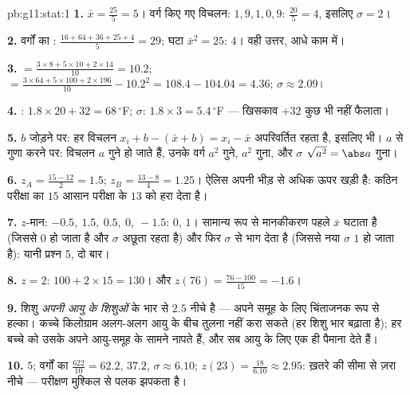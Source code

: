 \begin{solution}{pb:g11:stat:1}
\textbf{1.}  $\bar x = \frac{25}{5} = 5$। वर्ग किए गए विचलन: $1, 9, 1, 0, 9$:  $\frac{20}{5} = 4$, इसलिए $\sigma = 2$।

\textbf{2.} वर्गों का : $\frac{16 + 64 + 36 + 25 + 4}{5} = 29$; घटा $\bar x^2 = 25$:  $4$। वही उत्तर, आधे
काम में।

\textbf{3.}  $= \frac{3 \times 8 + 5 \times 10 + 2 \times
14}{10} = 10.2$;  $= \frac{3 \times 64 + 5 \times 100 +
2 \times 196}{10} - 10.2^2 = 108.4 - 104.04 = 4.36$; $\sigma \approx 2.09$।

\textbf{4.} : $1.8 \times 20 + 32 = 68\,^\circ$F; $\sigma$: $1.8 \times 3 = 5.4\,^\circ$F --- खिसकाव $+32$ कुछ भी नहीं
फैलाता।

\textbf{5.} $b$ जोड़ने पर: हर विचलन $x_i + b - (\bar x + b)
= x_i - \bar x$ अपरिवर्तित रहता है, इसलिए 
भी। $a$ से गुणा करने पर: विचलन $a$ गुने हो जाते हैं, उनके वर्ग $a^2$
गुने,  $a^2$ गुना, और $\sigma$ $\sqrt{a^2} = \abs a$ गुना।

\textbf{6.} $z_A = \frac{15 - 12}{2} = 1.5$; $z_B = \frac{13 - 8}{4} = 1.25$। ऐलिस अपनी भीड़ से अधिक ऊपर खड़ी है: कठिन परीक्षा
का $15$ आसान परीक्षा के $13$ को हरा देता है।

\textbf{7.} $z$-मान: $-0.5,\ 1.5,\ 0.5,\ 0,\ -1.5$:  $0$,  $1$। सामान्य रूप से
मानकीकरण पहले $\bar x$ घटाता है (जिससे  $0$ हो जाता है और $\sigma$ अछूता
रहता है) और फिर $\sigma$ से भाग देता है (जिससे नया $\sigma$ $1$ हो जाता है):
यानी प्रश्न 5, दो बार।

\textbf{8.} $z = 2$: $100 + 2 \times 15 = 130$। और $z(76) = \frac{76 - 100}{15} = -1.6$।

\textbf{9.} शिशु \emph{अपनी आयु के शिशुओं} के  भार से $2.5$ 
नीचे है --- अपने समूह के लिए चिंताजनक रूप से हल्का। कच्चे किलोग्राम अलग-अलग
आयु के बीच तुलना नहीं करा सकते (हर शिशु भार बढ़ाता है);  हर बच्चे को
उसके अपने आयु-समूह के सामने नापते हैं, और सब आयु के लिए एक ही पैमाना देते
हैं।

\textbf{10.}  $5$; वर्गों का  $\frac{622}{10} = 62.2$,  $37.2$, $\sigma \approx 6.10$; $z(23) = \frac{18}{6.10} \approx 2.95$:
ख़तरे की सीमा से ज़रा नीचे --- परीक्षण मुश्किल से पलक झपकता है।


\end{solution}

